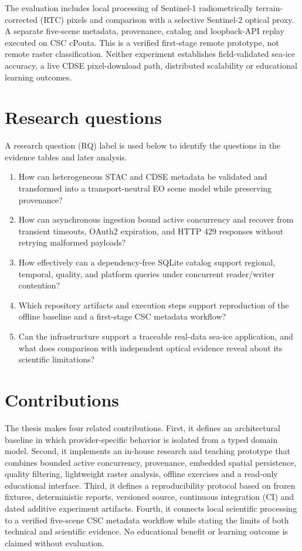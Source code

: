 The evaluation includes local processing of Sentinel-1 radiometrically terrain-corrected
(RTC) pixels and comparison with a
selective Sentinel-2 optical proxy. A separate five-scene metadata, provenance, catalog and
loopback-API replay executed on CSC cPouta. This is a verified first-stage remote prototype,
not remote raster classification. Neither experiment establishes field-validated sea-ice
accuracy, a live CDSE pixel-download path, distributed scalability or educational learning
outcomes.

\section{Research questions}

A research question (RQ) label is used below to identify the questions in the evidence
tables and later analysis.

\begin{enumerate}
  \item How can heterogeneous STAC and CDSE metadata be validated and transformed into a transport-neutral EO scene model while preserving provenance?
  \item How can asynchronous ingestion bound active concurrency and recover from transient timeouts, OAuth2 expiration, and HTTP 429 responses without retrying malformed payloads?
  \item How effectively can a dependency-free SQLite catalog support regional, temporal, quality, and platform queries under concurrent reader/writer contention?
  \item Which repository artifacts and execution steps support reproduction of the offline baseline and a first-stage CSC metadata workflow?
  \item Can the infrastructure support a traceable real-data sea-ice application, and what does comparison with independent optical evidence reveal about its scientific limitations?
\end{enumerate}

\section{Contributions}

The thesis makes four related contributions. First, it defines an architectural baseline in
which provider-specific behavior is isolated from a typed domain model. Second, it implements
an in-house research and teaching prototype that combines bounded active concurrency,
provenance, embedded spatial persistence, quality filtering, lightweight raster analysis,
offline exercises and a read-only educational interface. Third, it defines a reproducibility
protocol based on frozen fixtures, deterministic reports, versioned source, continuous
integration (CI) and dated
additive experiment artifacts. Fourth, it connects local scientific processing to a verified
five-scene CSC metadata workflow while stating the limits of both technical and scientific
evidence. No educational benefit or learning outcome is claimed without evaluation.

